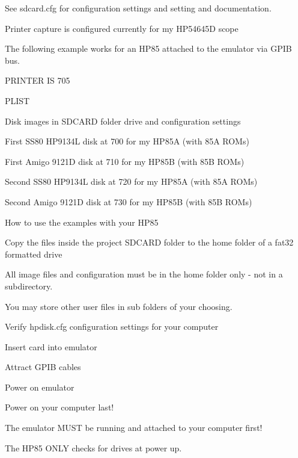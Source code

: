 \begin{DoxyItemize}
\item See sdcard.\+cfg for configuration settings and setting and documentation.
\begin{DoxyItemize}
\item Printer capture is configured currently for my H\+P54645D scope
\begin{DoxyItemize}
\item The following example works for an H\+P85 attached to the emulator via G\+P\+IB bus.
\begin{DoxyItemize}
\item P\+R\+I\+N\+T\+ER IS 705
\item P\+L\+I\+ST
\end{DoxyItemize}
\end{DoxyItemize}
\item Disk images in S\+D\+C\+A\+RD folder drive and configuration settings
\begin{DoxyItemize}
\item First S\+S80 H\+P9134L disk at 700 for my H\+P85A (with 85A R\+O\+Ms)
\item First Amigo 9121D disk at 710 for my H\+P85B (with 85B R\+O\+Ms)
\item Second S\+S80 H\+P9134L disk at 720 for my H\+P85A (with 85A R\+O\+Ms)
\item Second Amigo 9121D disk at 730 for my H\+P85B (with 85B R\+O\+Ms)
\end{DoxyItemize}
\item How to use the examples with your H\+P85
\begin{DoxyItemize}
\item Copy the files inside the project S\+D\+C\+A\+RD folder to the home folder of a fat32 formatted drive
\begin{DoxyItemize}
\item All image files and configuration must be in the home folder only -\/ not in a subdirectory.
\item You may store other user files in sub folders of your choosing.
\end{DoxyItemize}
\item Verify hpdisk.\+cfg configuration settings for your computer
\item Insert card into emulator
\item Attract G\+P\+IB cables
\item Power on emulator
\item Power on your computer last!
\begin{DoxyItemize}
\item The emulator M\+U\+ST be running and attached to your computer first!
\item The H\+P85 O\+N\+LY checks for drives at power up. 


\end{DoxyItemize}
\end{DoxyItemize}
\end{DoxyItemize}
\end{DoxyItemize}
